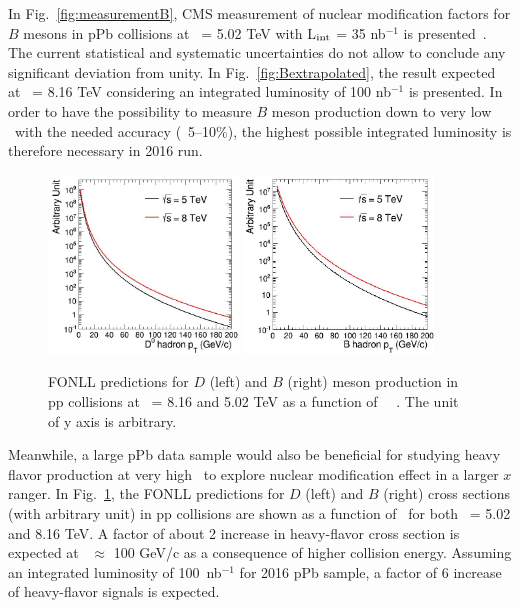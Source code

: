 In Fig.~\ref{fig:measurementB}, CMS measurement of nuclear modification factors
for $B$ mesons in pPb collisions at \rootsNN\ = 5.02 TeV with L$_{\rm int}$ = 35 nb$^{-1}$ 
is presented~\cite{PhysRevLett.116.032301}. The current statistical 
and systematic uncertainties do not allow to conclude any significant 
deviation from unity. In Fig.~\ref{fig:Bextrapolated}, the result expected 
at \rootsNN\ = 8.16 TeV considering an integrated luminosity of 100 nb$^{-1}$ 
is presented. In order to have the possibility to measure $B$ meson 
production down to very low \pt\ with the needed accuracy (~5--10\%), 
the highest possible integrated luminosity is therefore necessary in 2016 run.

\begin{figure}[h]
\begin{center}
\includegraphics[width= 0.45\textwidth]{figures/D-Sigma.jpg}
\includegraphics[width= 0.45\textwidth]{figures/B-Sigma.jpg}
\caption{FONLL predictions for $D$ (left) and $B$ (right) meson production 
in pp collisions at \roots\ = 8.16 and 5.02 TeV as a function of \pt\ ~\cite{FONLLcharmbottomPP1}.
The unit of y axis is arbitrary.
}
\label{fig:plotsDBpredictions}
\end{center}
\end{figure}

Meanwhile, a large pPb data sample would also be beneficial for 
studying heavy flavor production at very high \pt\ to explore
nuclear modification effect in a larger $x$ ranger. 
In Fig.~\ref{fig:plotsDBpredictions}, the FONLL predictions 
for $D$ (left) and $B$ (right) cross sections (with arbitrary unit) 
in pp collisions are shown as a function of \pt\ for both \roots\ = 5.02 and 8.16 TeV.
A factor of about 2 increase in heavy-flavor cross section is
expected at \pt\ $\approx$ 100 GeV/c as a consequence of higher
collision energy. Assuming an integrated luminosity of 100~nb$^{-1}$
for 2016 pPb sample, a factor of 6 increase of heavy-flavor signals
is expected.